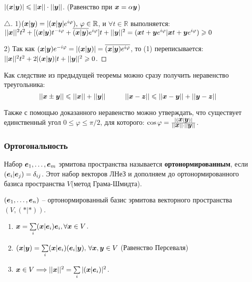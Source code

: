 \begin{to_thr}
	 $|(\mbox{\boldmath $x$}|\mbox{\boldmath $y$})| \leqslant ||\mbox{\boldmath $x$}|| \cdot ||\mbox{\boldmath $y$}||$. (Равенство при $\mbox{\boldmath $x$} = \alpha \mbox{\boldmath $y$}$)
\end{to_thr}

\begin{proof}[$\triangle$]
	1)$(\mbox{\boldmath $x$}|\mbox{\boldmath $y$}) = |(\mbox{\boldmath $x$}|\mbox{\boldmath $y$}| e^{i \varphi}), \, \varphi \in \mathbb{R}$, и $\forall t \in \mathbb{R}$ выполняется:
	$||\mbox{\boldmath $x$}||^2 t^2 + [(\mbox{\boldmath $x$}|\mbox{\boldmath $y$})t^{-i \varphi} + \overline{(\mbox{\boldmath $x$}|\mbox{\boldmath $y$})}e^{i \varphi}]t + ||\mbox{\boldmath $y$}||^2 = (\mbox{\boldmath $x$} t + \mbox{\boldmath $y$} e^{i \varphi} | \mbox{\boldmath $x$} t + \mbox{\boldmath $y$} e^{i \varphi}) \geqslant 0$

	2) Так как $(\mbox{\boldmath $x$}|\mbox{\boldmath $y$})e^{- i \varphi} = |(\mbox{\boldmath $x$}|\mbox{\boldmath $y$})| = \overline{(\mbox{\boldmath $x$}|\mbox{\boldmath $y$}) e^{i \varphi}}$, то (1) переписывается: $||\mbox{\boldmath $x$}||^2 t^2 + 2 |(\mbox{\boldmath $x$}|\mbox{\boldmath $y$})| t + ||\mbox{\boldmath $y$}||^2 \geqslant 0$.
\end{proof}

Как следствие из предыдущей теоремы можно сразу получить неравенство треугольника:
$$||\mbox{\boldmath $x$} \pm \mbox{\boldmath $y$}|| \leqslant ||\mbox{\boldmath $x$}|| + ||\mbox{\boldmath $y$}|| \hspace{1cm} ||\mbox{\boldmath $x$} - \mbox{\boldmath $z$}|| \leqslant ||\mbox{\boldmath $x$} - \mbox{\boldmath $y$}|| + ||\mbox{\boldmath $y$}-\mbox{\boldmath $z$}||$$

Также с помощью доказанного неравенство можно утверждать, что существует единственный угол $0 \leq \varphi \leq \pi/2$, для которого: $\cos \varphi = \frac{|(\mbox{\boldmath $x$}|\mbox{\boldmath $y$})|}{||\mbox{\boldmath $x$}||\cdot ||\mbox{\boldmath $y$}||}$.

\subsubsection{Ортогональность}
\begin{to_def} 
	 Набор $\mbox{\boldmath $e$}_1,\ldots,\mbox{\boldmath $e$}_m$ эрмитова пространства называется \textbf{ортонормированным}, если $(\mbox{\boldmath $e$}_i|\mbox{\boldmath $e$}_j) = \delta_{i j}$. Этот набор векторов ЛНеЗ и дополняем до ортонормированного базиса пространства $V$(метод Грама-Шмидта).
\end{to_def}

\begin{to_thr} 
	$(\mbox{\boldmath $e$}_1,\ldots,\mbox{\boldmath $e$}_n)$ -- ортонормированный базис эрмитова векторного пространства $(V, (*|*))$. 

	\begin{enumerate}[label = \roman*)	]
		\item $\mbox{\boldmath $x$} = \sum\limits_{ i }^{   } (\mbox{\boldmath $x$}|\mbox{\boldmath $e$}_i)\mbox{\boldmath $e$}_i, \forall \mbox{\boldmath $x$} \in V$.

		\item $(\mbox{\boldmath $x$}|\mbox{\boldmath $y$}) = \sum\limits_{ i }^{   } (\mbox{\boldmath $x$}|\mbox{\boldmath $e$}_i)(\mbox{\boldmath $e$}_i|\mbox{\boldmath $y$}),\, \forall \mbox{\boldmath $x$}, \mbox{\boldmath $y$} \in V$ (Равенство Персеваля)

		\item $\mbox{\boldmath $x$} \in V \Longrightarrow ||\mbox{\boldmath $x$}||^2 = \sum\limits_{ i }^{   } |(\mbox{\boldmath $x$}|\mbox{\boldmath $e$}_i)|^2$.
	\end{enumerate}
\end{to_thr}

